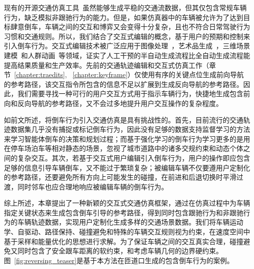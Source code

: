 现有的开源交通仿真工具~\cite{krajzewicz2002sumo, adnan2016simmobility, fellendorf1994vissim, dosovitskiy2017carla}虽然能够生成平稳的交通流数据，但其仅包含常规车辆行为，缺乏模拟非跟驰行为的能力。但是，如果仿真器中的车辆被允许为了达到目标肆意倒车，车辆之间的交互和博弈又会变得十分复杂，且也不符合日常驾驶行为习惯和交通规则。所以，我们结合了交互式编辑的概念，基于用户的预期和控制来引入倒车行为。交互式编辑技术被广泛应用于图像处理~\cite{ruhl2015interactive, dai2021edit}，艺术品生成~\cite{huang2022caripainter}，三维场景建模~\cite{zhang2021mageadd}和人群动画~\cite{kim2014interactive, zhang2020crowd, montana2017sketching}等领域，证实了人工干预的半自动生成流程比全自动生成流程能提高结果质量和生产效率。先前的交通轨迹编辑和交互式仿真工作（章节~\ref{chapter:traedits}, ~\ref{chapter:keyframe}）仅使用有序的关键点位生成前向导航的参考路径，该交互指令所包含的信息不足以扩展到生成反向导航的参考路径。因此，我们需要寻找一种可行的用户交互方式用于指示车辆行为，快捷地生成包含前向和反向导航的参考路径，又不会过多地提升用户交互操作的复杂程度。

如前文所述，将倒车行为引入交通仿真是具有挑战性的。首先，目前流行的交通轨迹数据集几乎没有捕捉或标记倒车行为，因此没有足够的数据支持监督学习的方法来学习智能体倒车的决策和规划过程；而基于强化学习的倒车行为学习更多的是用在停车场泊车等相对静态的场景，忽视了城市道路中的诸多交规约束和动态个体之间的复杂交互。其次，若基于交互式用户编辑引入倒车行为，用户的操作即应包含足够的信息引导车辆倒车，又不能过于繁琐复杂；被编辑车辆不仅要遵用户定制化的参考路径，还要避免所有方向上可能发生的碰撞，在前进和后退切换时平滑过渡，同时邻车也应合理地响应被编辑车辆的倒车行为。

综上所述，本章提出了一种新颖的交互式交通仿真框架，通过在仿真过程中为车辆指定关键状态来生成包含倒车引导的参考路径，得到同时包含跟驰行为和非跟驰行为的车辆轨迹数据，实现用户定制化生成多样的交通场景数据。我们将车辆运动学、自驱动、路径保持、碰撞避免和特殊的车辆交互规则视为约束，在速度空间中基于采样和能量优化的思想进行求解。为了保证车辆之间的交互真实合理，碰撞避免又同时包含了安全跟车距离的软约束，和考虑车辆几何的边界硬约束。图~\ref{fig:reversing_teaser}是基于本方法在匝道口生成的包含倒车行为的案例。

